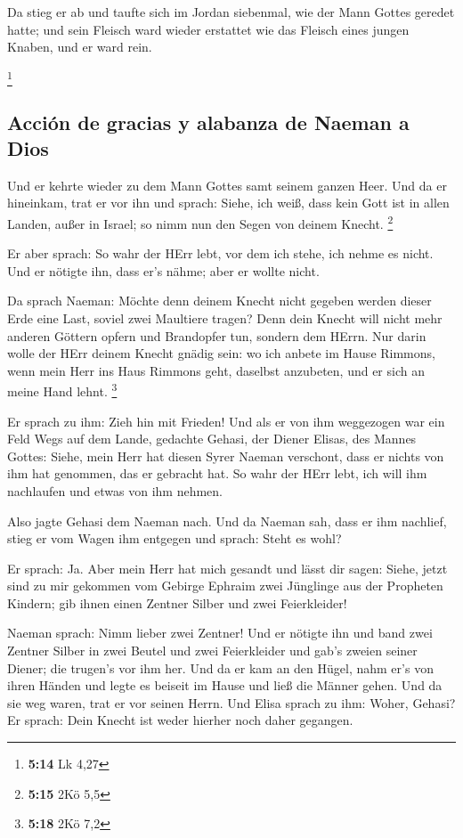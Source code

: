  Da stieg er ab und taufte sich im Jordan siebenmal, wie
der Mann Gottes geredet hatte; und sein Fleisch ward wieder erstattet
wie das Fleisch eines jungen Knaben, und er ward rein.

\footnote{\textbf{5:14} Lk 4,27}

\hypertarget{acciuxf3n-de-gracias-y-alabanza-de-naeman-a-dios}{%
\subsection{Acción de gracias y alabanza de Naeman a
Dios}\label{acciuxf3n-de-gracias-y-alabanza-de-naeman-a-dios}}

 Und er kehrte wieder zu dem Mann Gottes samt seinem
ganzen Heer. Und da er hineinkam, trat er vor ihn und sprach: Siehe, ich
weiß, dass kein Gott ist in allen Landen, außer in Israel; so nimm nun
den Segen von deinem Knecht. \footnote{\textbf{5:15} 2Kö 5,5}

 Er aber sprach: So wahr der HErr lebt, vor dem ich
stehe, ich nehme es nicht. Und er nötigte ihn, dass er's nähme; aber er
wollte nicht.

 Da sprach Naeman: Möchte denn deinem Knecht nicht
gegeben werden dieser Erde eine Last, soviel zwei Maultiere tragen? Denn
dein Knecht will nicht mehr anderen Göttern opfern und Brandopfer tun,
sondern dem HErrn.  Nur darin wolle der HErr deinem
Knecht gnädig sein: wo ich anbete im Hause Rimmons, wenn mein Herr ins
Haus Rimmons geht, daselbst anzubeten, und er sich an meine Hand lehnt.
\footnote{\textbf{5:18} 2Kö 7,2}

 Er sprach zu ihm: Zieh hin mit Frieden! Und als er von
ihm weggezogen war ein Feld Wegs auf dem Lande,  gedachte
Gehasi, der Diener Elisas, des Mannes Gottes: Siehe, mein Herr hat
diesen Syrer Naeman verschont, dass er nichts von ihm hat genommen, das
er gebracht hat. So wahr der HErr lebt, ich will ihm nachlaufen und
etwas von ihm nehmen.

 Also jagte Gehasi dem Naeman nach. Und da Naeman sah,
dass er ihm nachlief, stieg er vom Wagen ihm entgegen und sprach: Steht
es wohl?

 Er sprach: Ja. Aber mein Herr hat mich gesandt und lässt
dir sagen: Siehe, jetzt sind zu mir gekommen vom Gebirge Ephraim zwei
Jünglinge aus der Propheten Kindern; gib ihnen einen Zentner Silber und
zwei Feierkleider!

 Naeman sprach: Nimm lieber zwei Zentner! Und er nötigte
ihn und band zwei Zentner Silber in zwei Beutel und zwei Feierkleider
und gab's zweien seiner Diener; die trugen's vor ihm her.
 Und da er kam an den Hügel, nahm er's von ihren Händen
und legte es beiseit im Hause und ließ die Männer gehen. 
Und da sie weg waren, trat er vor seinen Herrn. Und Elisa sprach zu ihm:
Woher, Gehasi? Er sprach: Dein Knecht ist weder hierher noch daher
gegangen.

